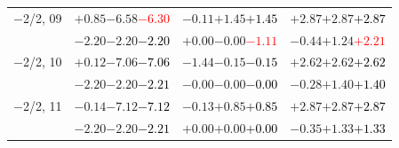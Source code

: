 \documentclass[compress]{beamer}
\begin{document}
\begin{frame}
\begin{tabular}{r | c | c | c}
$-$2/2, 09 & $+0.85$\hspace{0.1 cm}$-6.58$\hspace{0.1 cm}\textcolor{red}{$-6.30$} & $-0.11$\hspace{0.1 cm}$+1.45$\hspace{0.1 cm}\textcolor{black}{$+1.45$} & $+2.87$\hspace{0.1 cm}$+2.87$\hspace{0.1 cm}\textcolor{black}{$+2.87$} \\
           & $-2.20$\hspace{0.1 cm}$-2.20$\hspace{0.1 cm}\textcolor{black}{$-2.20$} & $+0.00$\hspace{0.1 cm}$-0.00$\hspace{0.1 cm}\textcolor{red}{$-1.11$} & $-0.44$\hspace{0.1 cm}$+1.24$\hspace{0.1 cm}\textcolor{red}{$+2.21$} \\
$-$2/2, 10 & $+0.12$\hspace{0.1 cm}$-7.06$\hspace{0.1 cm}\textcolor{black}{$-7.06$} & $-1.44$\hspace{0.1 cm}$-0.15$\hspace{0.1 cm}\textcolor{black}{$-0.15$} & $+2.62$\hspace{0.1 cm}$+2.62$\hspace{0.1 cm}\textcolor{black}{$+2.62$} \\
           & $-2.20$\hspace{0.1 cm}$-2.20$\hspace{0.1 cm}\textcolor{black}{$-2.21$} & $-0.00$\hspace{0.1 cm}$-0.00$\hspace{0.1 cm}\textcolor{black}{$-0.00$} & $-0.28$\hspace{0.1 cm}$+1.40$\hspace{0.1 cm}\textcolor{black}{$+1.40$} \\
$-$2/2, 11 & $-0.14$\hspace{0.1 cm}$-7.12$\hspace{0.1 cm}\textcolor{black}{$-7.12$} & $-0.13$\hspace{0.1 cm}$+0.85$\hspace{0.1 cm}\textcolor{black}{$+0.85$} & $+2.87$\hspace{0.1 cm}$+2.87$\hspace{0.1 cm}\textcolor{black}{$+2.87$} \\
           & $-2.20$\hspace{0.1 cm}$-2.20$\hspace{0.1 cm}\textcolor{black}{$-2.21$} & $+0.00$\hspace{0.1 cm}$+0.00$\hspace{0.1 cm}\textcolor{black}{$+0.00$} & $-0.35$\hspace{0.1 cm}$+1.33$\hspace{0.1 cm}\textcolor{black}{$+1.33$} \\

\end{tabular}
\end{frame}
\end{document}
